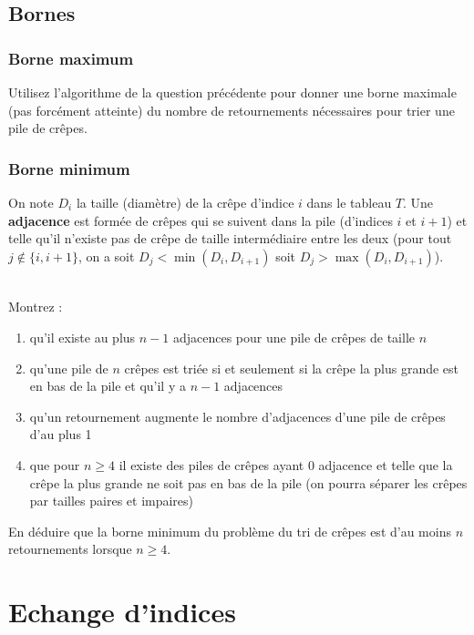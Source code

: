 \documentclass
[12pt]
{article}
\begin{document}
\subsection{Bornes}

\subsubsection{Borne maximum}

Utilisez l'algorithme de la question précédente pour donner une borne maximale (pas forcément atteinte) du nombre de retournements nécessaires pour trier une pile de crêpes.

\subsubsection{Borne minimum}

On note $D_i$ la taille (diamètre) de la crêpe d'indice $i$ dans le tableau $T$. 
Une {\bf adjacence} est formée de crêpes qui se suivent dans la pile (d'indices $i$ et $i+1$) et telle qu'il n'existe pas de crêpe de taille intermédiaire entre les deux (pour tout $j \notin\{i, i+1\}$, on a soit $D_{j} < \min(D_i, D_{i+1})$ soit $D_{j} > \max(D_i, D_{i+1})$). 

~\\
Montrez : 

\begin{enumerate}
    \item qu'il existe au plus $n-1$ adjacences pour une pile de crêpes de taille $n$
    \item qu'une pile de $n$ crêpes est triée si et seulement si la crêpe la plus grande est en bas de la pile et qu'il y a $n-1$ adjacences
    \item qu'un retournement augmente le nombre d'adjacences d'une pile de crêpes d'au plus 1
    \item que pour $n\geq 4$ il existe des piles de crêpes ayant 0 adjacence et telle que la crêpe la plus grande ne soit pas en bas de la pile (on pourra séparer les crêpes par tailles paires et impaires)
\end{enumerate}

En déduire que la borne minimum du problème du tri de crêpes est d'au moins $n$ retournements lorsque $n \geq 4$.

\section{Echange d'indices}
\end{document}
